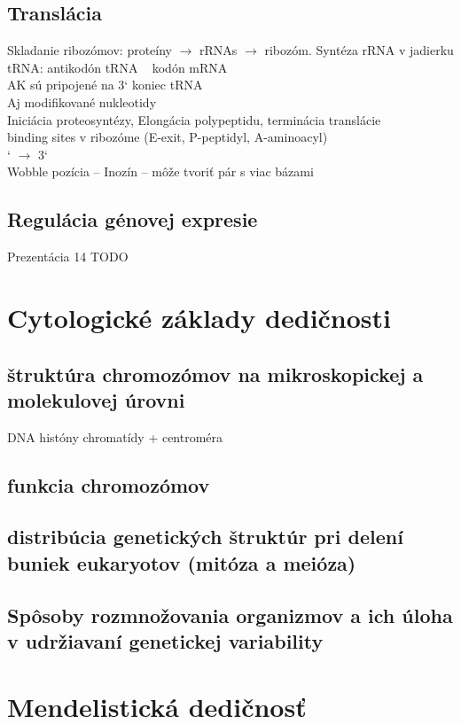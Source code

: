 \subsection{Translácia}
\tab Skladanie ribozómov: proteíny $\rightarrow$ rRNAs $\rightarrow$ ribozóm. Syntéza rRNA v jadierku\\
\tab tRNA: \tab antikodón tRNA ~ kodón mRNA\\
\tab \tab AK sú pripojené na 3` koniec tRNA\\
\tab \tab Aj modifikované nukleotidy\\
\tab \tab Iniciácia proteosyntézy, Elongácia polypeptidu, terminácia translácie\\
 binding sites v ribozóme (E-exit, P-peptidyl, A-aminoacyl)\\
` $\rightarrow$ 3`\\
\tab Wobble pozícia -- Inozín -- môže tvoriť pár s viac bázami\\
\subsection{Regulácia génovej expresie}
\tab Prezentácia 14 TODO\\

\section{Cytologické základy dedičnosti}
\subsection{štruktúra chromozómov na mikroskopickej a molekulovej úrovni}
DNA \ra históny \ra chromatídy + centroméra\\
\subsection{funkcia chromozómov}
\subsection{distribúcia genetických štruktúr pri delení buniek eukaryotov (mitóza a meióza)}
\subsection{Spôsoby rozmnožovania organizmov a ich úloha v udržiavaní genetickej variability}

\section{Mendelistická dedičnosť}
